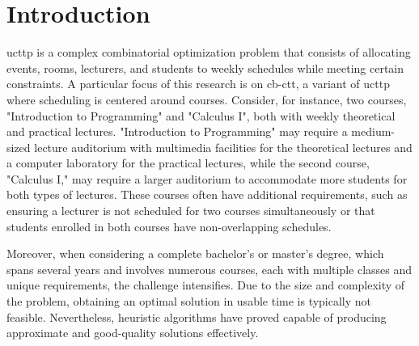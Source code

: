 
\chapter{Introduction}


\label{Introduction}


\ac{ucttp} is a complex combinatorial optimization problem that consists of allocating events, rooms, lecturers, and students to weekly schedules while meeting certain constraints. A particular focus of this research is on \ac{cb-ctt}, a variant of \ac{ucttp} where scheduling is centered around courses. Consider, for instance, two courses, "Introduction to Programming" and "Calculus I", both with weekly theoretical and practical lectures. "Introduction to Programming" may require a medium-sized lecture auditorium with multimedia facilities for the theoretical lectures and a computer laboratory for the practical lectures, while the second course, "Calculus I," may require a larger auditorium to accommodate more students for both types of lectures. These courses often have additional requirements, such as ensuring a lecturer is not scheduled for two courses simultaneously or that students enrolled in both courses have non-overlapping schedules. 

Moreover, when considering a complete bachelor’s or master’s degree, which spans several years and involves numerous courses, each with multiple classes and unique requirements, the challenge intensifies. Due to the size and complexity of the problem, obtaining an optimal solution in usable time is typically not feasible. Nevertheless, heuristic algorithms have proved capable of producing approximate and good-quality solutions effectively. 

